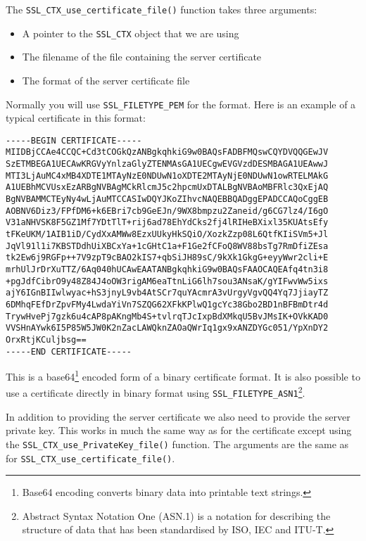 The \verb!SSL_CTX_use_certificate_file()! function takes three arguments:

\begin{itemize}
\item A pointer to the \texttt{SSL\_CTX} object that we are using
\item The filename of the file containing the server certificate
\item The format of the server certificate file
\end{itemize}

Normally you will use \verb!SSL_FILETYPE_PEM! for the format. Here is an 
example of a typical certificate in this format:

\begin{verbatim}
-----BEGIN CERTIFICATE-----
MIIDBjCCAe4CCQC+Cd3tCOGkQzANBgkqhkiG9w0BAQsFADBFMQswCQYDVQQGEwJV
SzETMBEGA1UECAwKRGVyYnlzaGlyZTENMAsGA1UECgwEVGVzdDESMBAGA1UEAwwJ
MTI3LjAuMC4xMB4XDTE1MTAyNzE0NDUwN1oXDTE2MTAyNjE0NDUwN1owRTELMAkG
A1UEBhMCVUsxEzARBgNVBAgMCkRlcmJ5c2hpcmUxDTALBgNVBAoMBFRlc3QxEjAQ
BgNVBAMMCTEyNy4wLjAuMTCCASIwDQYJKoZIhvcNAQEBBQADggEPADCCAQoCggEB
AOBNV6Diz3/FPfDM6+k6EBri7cb9GeEJn/9WX8bmpzu2Zaneid/g6CG7lz4/I6gO
V31aNHVSK8F5GZ1Mf7YDtTlT+rij6ad78EhYdCks2fj4lRIHeBXixl35KUAtsEfy
tFKeUKM/1AIB1iD/CydXxAMWw8EzxUUkyHkSQiO/XozkZzp08L6QtfKIiSVm5+Jl
JqVl91l1i7KBSTDdhUiXBCxYa+1cGHtC1a+F1Ge2fCFoQ8WV88bsTg7RmDfiZEsa
tk2Ew6j9RGFp++7V9zpT9cBAO2kIS7+qbSiJH89sC/9kXk1GkgG+eyyWwr2cli+E
mrhUlJrDrXuTTZ/6Aq040hUCAwEAATANBgkqhkiG9w0BAQsFAAOCAQEAfq4tn3i8
+pgJdfCibrO9y48Z84J4oOW3rigAM6eaTtnLiG6lh7sou3ANsaK/gYIFwvWw5ixs
ajY6IGnBIIwlwyac+hS3jnyL9vb4AtSCr7quYAcmrA3vUrgyVgvQQ4Yq7JjiayTZ
6DMhqFEfDrZpvFMy4LwdaYiVn7SZQG62XFkKPlwQ1gcYc38Gbo2BD1nBFBmDtr4d
TrywHvePj7gzk6u4cAP8pAKngMb4S+tvlrqTJcIxpBdXMkqU5BvJMsIK+OVkKAD0
VVSHnAYwk6I5P85W5JW0K2nZacLAWQknZAOaQWrIq1gx9xANZDYGc051/YpXnDY2
OrxRtjKCuljbsg==
-----END CERTIFICATE-----
\end{verbatim}

This is a base64\footnote{Base64 encoding converts binary data into printable 
text strings.} encoded form of a binary certificate format. It is also 
possible to use a certificate directly in binary format using 
\verb!SSL_FILETYPE_ASN1!\footnote{Abstract Syntax Notation One (ASN.1) is a 
notation for describing the structure of data that has been standardised by 
ISO, IEC and ITU-T.}.

In addition to providing the server certificate we also need to provide the 
server private key. This works in much the same way as for the certificate 
except using the \verb!SSL_CTX_use_PrivateKey_file()! function. The arguments 
are the same as for \verb!SSL_CTX_use_certificate_file()!.

